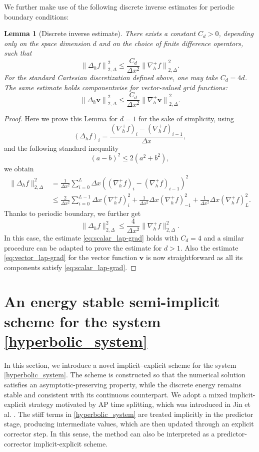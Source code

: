 \documentclass[11pt]{article}
\numberwithin{equation}{section}
\newtheorem{lemma}[theorem]{Lemma}
\newtheorem{counter example}[theorem]{Counter Example}
\numberwithin{equation}{section}
\numberwithin{equation}{section}
\begin{document}
We further make use of the following discrete inverse estimates for periodic boundary conditions:
\begin{lemma}[Discrete inverse estimate]
\label{lemma:discrete_inverse}
There exists a constant $C_d>0$, depending only on the space dimension $d$ and on the choice of finite difference operators, such that
\begin{equation}
    \label{eq:scalar_lap-grad}
    {\|\Delta_h f\|}_{2, \Delta}^2
\leq
\frac{C_d}{\Delta x^2}
{\|\nabla_h^+ f\|}_{2, \Delta}^2.
\end{equation}
For the standard Cartesian discretization defined above, one may take $C_d=4d$. The same estimate holds componentwise for vector-valued grid functions:
\begin{equation}
    \label{eq:vector_lap-grad}
    {\|\Delta_h\mathbf v\|}_{2, \Delta}^2
\leq
\frac{C_d}{\Delta x^2}
{\|\nabla_h^+\mathbf v\|}_{2, \Delta}^2.
\end{equation}
\end{lemma}
\begin{proof}
Here we prove this Lemma for $d = 1$ for the sake of simplicity, using
\[
(\Delta_h f)_i=\frac{(\nabla_h^+f)_i-(\nabla_h^+f)_{i-1}}{\Delta x},
\]
and the following standard inequality
\[
(a-b)^2\le 2(a^2+b^2),
\]
we obtain
\begin{align*}
\|\Delta_h f\|_{2,\Delta}^2
&=
\frac{1}{\Delta x^2}\sum_{i=0}^L
\Delta x((\nabla_h^+f)_i-(\nabla_h^+f)_{i-1})^2\\
&\le\frac{2}{\Delta x^2}\sum_{i=0}^{L-1}
\Delta x(\nabla_h^+f)_i^2
+\frac{1}{\Delta x^2}\Delta x (\nabla_h^+f)_{-1}^2+\frac{1}{\Delta x^2}\Delta x(\nabla_h^+f)_L^2.
\end{align*}
Thanks to periodic boundary, we further get
\begin{equation}
\|\Delta_h f\|_{2,\Delta}^2\le\frac{4}{\Delta x^2}\|\nabla_h^+f\|_{2,\Delta}^2.
\end{equation}
In this case, the estimate \eqref{eq:scalar_lap-grad} holds with $C_d=4$ and a similar procedure can be adapted to prove the estimate for $d>1$. Also the estimate \eqref{eq:vector_lap-grad} for the vector function $\mathbf{v}$ is now straightforward as all its components satisfy \eqref{eq:scalar_lap-grad}.
\end{proof}

\section{An energy stable semi-implicit scheme for the system \eqref{hyperbolic_system}}
\label{sec:structure-preserving_scheme}
In this section, we introduce a novel implicit--explicit scheme for the system \eqref{hyperbolic_system}. The scheme is constructed so that the numerical solution satisfies an asymptotic-preserving property, while the discrete energy remains stable and consistent with its continuous counterpart. We adopt a mixed implicit-explicit strategy motivated by AP time splitting, 
which was introduced in Jin et al. \cite{jin1998diffusive}. The stiff terms in \eqref{hyperbolic_system} are treated implicitly in the predictor stage, producing intermediate values, which are then updated through an explicit corrector step. In this sense, the method can also be interpreted as a predictor-corrector implicit-explicit scheme.
\end{document}
